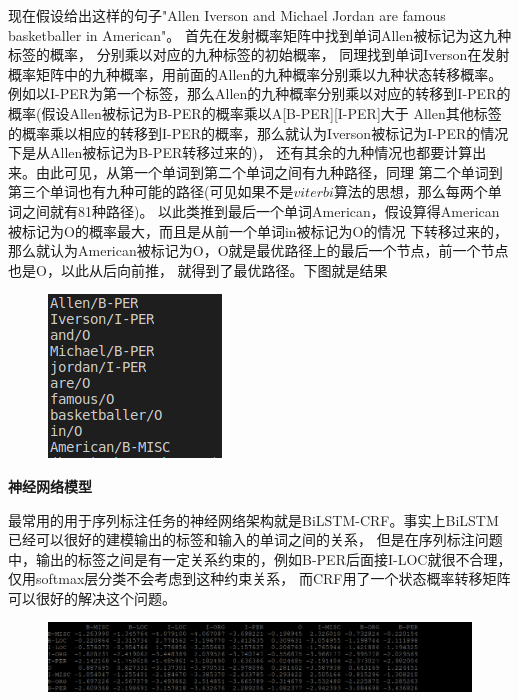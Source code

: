 \documentclass[openany,oneside]{ctexbook}
\begin{document}
现在假设给出这样的句子"Allen Iverson and Michael Jordan are famous basketballer in American"。
首先在发射概率矩阵中找到单词Allen被标记为这九种标签的概率，
分别乘以对应的九种标签的初始概率，
同理找到单词Iverson在发射概率矩阵中的九种概率，用前面的Allen的九种概率分别乘以九种状态转移概率。
例如以I-PER为第一个标签，那么Allen的九种概率分别乘以对应的转移到I-PER的概率(假设Allen被标记为B-PER的概率乘以A[B-PER][I-PER]大于
Allen其他标签的概率乘以相应的转移到I-PER的概率，那么就认为Iverson被标记为I-PER的情况下是从Allen被标记为B-PER转移过来的)，
还有其余的九种情况也都要计算出来。由此可见，从第一个单词到第二个单词之间有九种路径，同理
第二个单词到第三个单词也有九种可能的路径(可见如果不是$viterbi$算法的思想，那么每两个单词之间就有81种路径)。
以此类推到最后一个单词American，假设算得American被标记为O的概率最大，而且是从前一个单词in被标记为O的情况
下转移过来的，那么就认为American被标记为O，O就是最优路径上的最后一个节点，前一个节点也是O，以此从后向前推，
就得到了最优路径。下图就是结果
\begin{figure}[htp]
   \centering
   \includegraphics[scale=1.2]{print.png}
   
\end{figure}


{\bfseries 神经网络模型}

最常用的用于序列标注任务的神经网络架构就是BiLSTM-CRF。事实上BiLSTM已经可以很好的建模输出的标签和输入的单词之间的关系，
但是在序列标注问题中，输出的标签之间是有一定关系约束的，例如B-PER后面接I-LOC就很不合理，仅用softmax层分类不会考虑到这种约束关系，
而CRF用了一个状态概率转移矩阵可以很好的解决这个问题。
\begin{figure}[htp]
   \centering
   \includegraphics[scale=0.5]{trans_matrix.png}
   
\end{figure}
\end{document}
